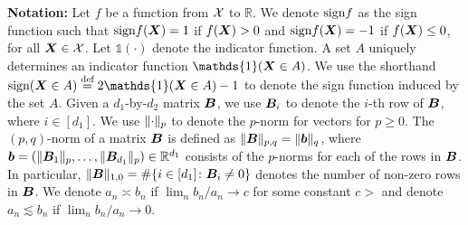 \documentclass[11pt]{article}
\theoremstyle{definition}
\def\sign{\textup{sign}}
\begin{document}


 
{\bf Notation:} Let $f$ be a function from $\mathcal{X}$ to $\mathbb{R}$. We denote $\sign f$ as the sign function such that $\sign f(\mX)=1$ if $f(\bm X)>0$ and $\sign f(\mX)=-1$ if $f(\bm X)\leq 0$, for all $\bm X\in \mathcal{X}$.  Let $\mathds{1}(\cdot)$ denote the indicator function. A set $A$ uniquely determines an indicator function $\mathds{1}(\mX\in A)$. We use the shorthand $\sign (\mX\in A)\stackrel{\text{def}}{=}2\mathds{1}(\mX\in A)-1$ to denote the sign function induced by the set $A$.  Given a $d_1$-by-$d_2$ matrix $\bm B$, we use $\bm B_i$ to denote the $i$-th row of $\bm B$, where $i\in[d_1]$. We use $\lVert\cdot\rVert_p$ to denote the $p$-norm for vectors for $p\geq 0$. The $(p,q)$-norm of a matrix $\bm B$ is defined as $\lVert\bm B\rVert_{p,q}=\lVert\bm{b}\rVert_q$, where $\bm{b}=(\lVert\bm B_1\rVert_p,\ldots,\lVert\bm B_{d_1}\rVert_p)\in\mathbb{R}^{d_1}$ consists of the $p$-norms for each of the rows in $\bm B$. In particular, $\lVert\bm B\rVert_{1,0}=\#\{i\in [d_1]\colon \bm B_i\neq 0\}$ denotes the number of non-zero rows in $\bm B$.
We denote $a_n\asymp b_n$ if $\lim_n b_n/a_n\rightarrow c$ for some constant $c>$ and denote $a_n\lesssim b_n$ if $\lim_n b_n/a_n\rightarrow 0.$
 
\end{document}
